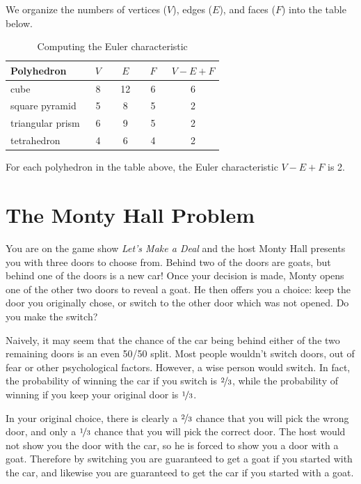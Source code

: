 \documentclass[final]{ukthesis} %
\begin{document}
We organize the numbers of vertices ($V$), edges ($E$), and faces ($F$) into the table below.

\renewcommand{\arraystretch}{1.4}
\begin{table}[h]
\centering
\caption{Computing the Euler characteristic}
\begin{tabular}{||l|c|c|c|c||}
\hline
Polyhedron & ~$V$~ & ~$E$~ & ~$F$~ & $V - E + F$ \\ \hline \hline
cube & 8 & 12 & 6 & 6 \\ \hline
square pyramid & 5 & 8 & 5 & 2 \\ \hline
triangular prism & 6 & 9 & 5 & 2 \\ \hline
tetrahedron & 4 & 6 & 4 & 2 \\ \hline
\end{tabular}
\end{table}
\renewcommand{\arraystretch}{1.0}

For each polyhedron in the table above, the Euler characteristic $V-E+F$ is 2.

\section{The Monty Hall Problem}

You are on the game show \textit{Let's Make a Deal} and the host Monty Hall presents you with three doors to choose from. Behind two of the doors are goats, but behind one of the doors is a new car! Once your decision is made, Monty opens one of the other two doors to reveal a goat. He then offers you a choice: keep the door you originally chose, or switch to the other door which was not opened. Do you make the switch?

Naively, it may seem that the chance of the car being behind either of the two remaining doors is an even 50/50 split. Most people wouldn't switch doors, out of fear or other psychological factors. However, a wise person would switch. In fact, the probability of winning the car if you switch is $\nicefrac{2}{3}$, while the probability of winning if you keep your original door is $\nicefrac{1}{3}$.

In your original choice, there is clearly a $\nicefrac{2}{3}$ chance that you will pick the wrong door, and only a $\nicefrac{1}{3}$ chance that you will pick the correct door. The host would not show you the door with the car, so he is forced to show you a door with a goat. Therefore by switching you are guaranteed to get a goat if you started with the car, and likewise you are guaranteed to get the car if you started with a goat.
\end{document}
